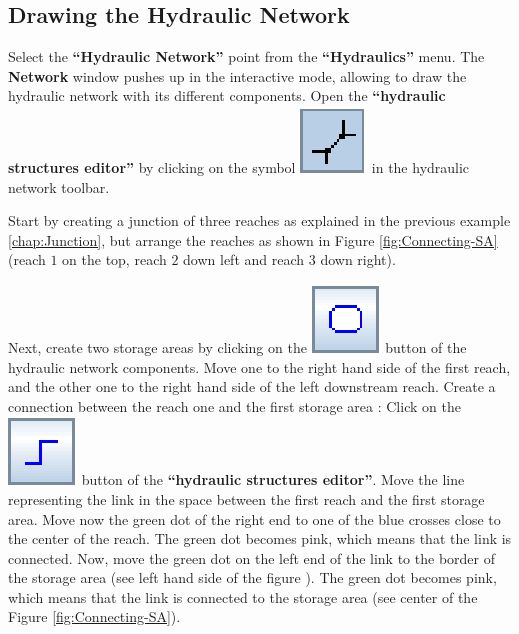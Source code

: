 \documentclass[a4paper,12pt]{article}
\begin{document}
\subsection{Drawing the Hydraulic Network\label{sub:Drawing-the-Hydraulic} 
  
  }

\hspace{0.5cm} Select the \textbf{{}``Hydraulic Network''} point from the \textbf{{}``Hydraulics''}
menu. The \textbf{Network} window pushes up in the interactive mode,
allowing to draw the hydraulic network with its different components.
Open the \textbf{{}``hydraulic structures editor''} by clicking
on the symbol \includegraphics[scale=0.6]{create_nw}
in the hydraulic network toolbar.

\vspace{0.5cm}

Start by creating a junction of three reaches as explained in the
previous example \ref{chap:Junction}, but arrange the reaches as
shown in Figure \ref{fig:Connecting-SA} (reach $1$ on the top, reach
$2$ down left and reach $3$ down right). 

\vspace{0.5cm}

Next, create two storage areas by clicking on the \includegraphics[scale=0.6]{storage_area} button
of the hydraulic network components. Move one to the right hand side
of the first reach, and the other one to the right hand side of the
left downstream reach. Create a connection between the reach one and
the first storage area : Click on the \includegraphics[scale=0.6]{link_sa} button
of the \textbf{{}``hydraulic structures editor''}. Move the line
representing the link in the space between the first reach and the
first storage area. Move now the green dot of the right end to one
of the blue crosses close to the center of the reach. The green dot
becomes pink, which means that the link is connected. Now, move the
green dot on the left end of the link to the border of the storage
area (see left hand side of the figure ). The green dot becomes pink,
which means that the link is connected to the storage area (see center
of the Figure \ref{fig:Connecting-SA}).
\end{document}
